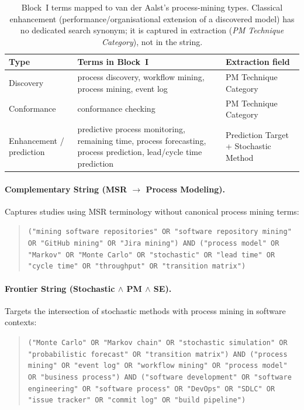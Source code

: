 \begin{table}[htbp]
\centering
\caption{Block~I terms mapped to van der Aalst's process-mining types.
Classical enhancement (performance/organisational extension of a discovered
model) has no dedicated search synonym; it is captured in extraction
(\textit{PM Technique Category}), not in the string.}
\label{tab:block-i-pm-types}
\small
\begin{tabular}{p{3.2cm} p{6.2cm} p{3.8cm}}
\toprule
\textbf{Type} & \textbf{Terms in Block~I} & \textbf{Extraction field} \\
\midrule
Discovery & process discovery, workflow mining, process mining, event log &
  PM Technique Category \\
Conformance & conformance checking & PM Technique Category \\
Enhancement / prediction & predictive process monitoring, remaining time,
  process forecasting, process prediction, lead/cycle time prediction &
  Prediction Target + Stochastic Method \\
\bottomrule
\end{tabular}
\end{table}

\paragraph{Complementary String (MSR $\rightarrow$ Process Modeling).}
Captures studies using MSR terminology without canonical process mining terms:

\begin{quote}
\small
\texttt{("mining software repositories" OR "software repository mining" OR
"GitHub mining" OR "Jira mining") AND ("process model" OR "Markov" OR "Monte
Carlo" OR "stochastic" OR "lead time" OR "cycle time" OR "throughput" OR
"transition matrix")}
\end{quote}

\paragraph{Frontier String (Stochastic $\wedge$ PM $\wedge$ SE).}
Targets the intersection of stochastic methods with process mining in software
contexts:

\begin{quote}
\small
\texttt{("Monte Carlo" OR "Markov chain" OR "stochastic simulation" OR
"probabilistic forecast" OR "transition matrix") AND ("process mining" OR
"event log" OR "workflow mining" OR "process model" OR "business process") AND
("software development" OR "software engineering" OR "software process" OR
"DevOps" OR "SDLC" OR "issue tracker" OR "commit log" OR "build pipeline")}
\end{quote}

